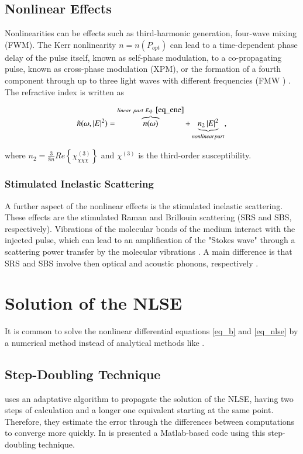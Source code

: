    

\subsection{Nonlinear Effects}

    Nonlinearities can be effects such as third-harmonic generation, four-wave mixing (FWM). The Kerr nonlinearity $n = n(P_{opt})$
    can lead to a time-dependent phase delay of the pulse itself, known as self-phase modulation, to a co-propagating pulse, known as cross-phase modulation (XPM), or the formation of a fourth component through up to three light waves with different frequencies (FMW ) \cite{rein}. The refractive index is written as
    
    
    \begin{equation}
        \tilde{n} (\omega, \left| E \right|^2) = \overbrace{n(\omega)}^{linear \ part \ Eq. \ \eqref{eq_ene}} + \underbrace{ n_2 \left| E \right|^2}_{nonlinear part},
    \end{equation} 
   
   where $n_2 = \frac{3}{8n}Re\left\{ \chi^{(3)}_{\chi \chi \chi}\right\}$ and $\chi^{(3)}$ is the third-order susceptibility.
   
   \subsubsection{Stimulated Inelastic Scattering}
    A further aspect of the nonlinear effects is the stimulated inelastic scattering. These effects are the stimulated Raman and Brillouin scattering (SRS and SBS, respectively). Vibrations of the molecular bonds of the medium interact with the injected pulse, which can lead to an amplification of the "Stokes wave" through a scattering power transfer by the molecular vibrations \cite{rein}. A main difference is that SRS and SBS involve then optical and acoustic phonons, respectively \cite{AgrawalBook}.
   
        \section{Solution of the NLSE}
    
        It is common to solve the nonlinear differential equations \eqref{eq_b} and \eqref{eq_nlse} by a numerical method instead of analytical methods like \citep{Mihalache_1993}.  


    \subsection{Step-Doubling Technique}
         \citep{dudley_taylor_2010}uses an adaptative algorithm to propagate the solution of the NLSE, having two steps of calculation and a longer one equivalent starting at the same point. Therefore, they estimate the error through the differences between computations to converge more quickly. In \citep{gitdud}  is presented a Matlab-based code using this step-doubling technique. 
         
